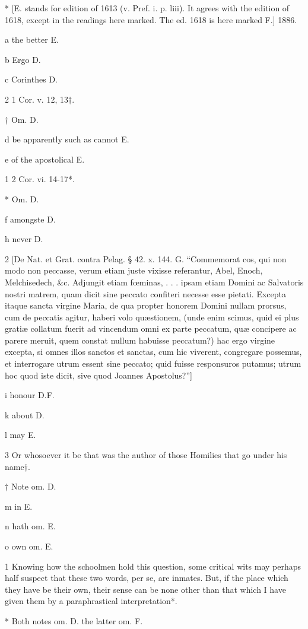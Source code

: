 *
[E. stands for edition of 1613 (v. Pref. i. p. liii). It agrees with the edition of 1618, except in the readings here marked. The ed. 1618 is here marked F.] 1886.

a
the better E.

b
Ergo D.

c
Corinthes D.

2
1 Cor. v. 12, 13†.

†
Om. D.

d
be apparently such as cannot E.

e
of the apostolical E.

1
2 Cor. vi. 14-17*.

*
Om. D.

f
amongste D.

h
never D.

2
[De Nat. et Grat. contra Pelag. § 42. x. 144. G. “Commemorat cos, qui non modo non peccasse, verum etiam juste vixisse referantur, Abel, Enoch, Melchisedech, &c. Adjungit etiam fœminas, . . . ipsam etiam Domini ac Salvatoris nostri matrem, quam dicit sine peccato confiteri necesse esse pietati. Excepta itaque sancta virgine Maria, de qua propter honorem Domini nullam prorsus, cum de peccatis agitur, haberi volo quæstionem, (unde enim scimus, quid ei plus gratiæ collatum fuerit ad vincendum omni ex parte peccatum, quæ concipere ac parere meruit, quem constat nullum habuisse peccatum?) hac ergo virgine excepta, si omnes illos sanctos et sanctas, cum hic viverent, congregare possemus, et interrogare utrum essent sine peccato; quid fuisse responsuros putamus; utrum hoc quod iste dicit, sive quod Joannes Apostolus?”]

i
honour D.F.

k
about D.

l
may E.

3
Or whosoever it be that was the author of those Homilies that go under his name†.

†
Note om. D.

m
in E.

n
hath om. E.

o
own om. E.

1
Knowing how the schoolmen hold this question, some critical wits may perhaps half suspect that these two words, per se, are inmates. But, if the place which they have be their own, their sense can be none other than that which I have given them by a paraphrastical interpretation*.

*
Both notes om. D. the latter om. F.


